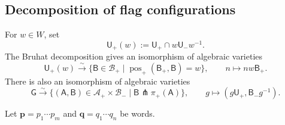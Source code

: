 \documentclass[10pt,a4paper]{article}
\theoremstyle{definition}
\theoremstyle{remark}
\newcommand{\Aplus}{\mathcal A_+}
\newcommand{\Bplus}{\mathcal B_+}
\newcommand{\Bminus}{\mathcal B_-}
\newcommand{\flagA}{\mathsf{A}}
\newcommand{\flagB}{\mathsf{B}}
\newcommand{\groupG}{\mathsf{G}}
\newcommand{\borelB}{\mathsf{B}}
\newcommand{\unipotentU}{\mathsf{U}}
\newcommand{\pos}{\operatorname{pos}}
\begin{document}
\subsection{Decomposition of flag configurations}
\label{subsec:double-flag-decomposition}

For \(w\in W\), set
\[
 \unipotentU_+(w):=\unipotentU_+\cap w\unipotentU_-w^{-1}.
\]
The Bruhat decomposition gives an isomorphism of algebraic varieties
\begin{equation}
 \unipotentU_+(w)
 \xrightarrow{\sim}
 \{\flagB\in\Bplus\mid\pos_+(\borelB_+,\flagB)=w\},
 \qquad
 n\longmapsto nw\borelB_+.
 \label{eq:component-bruhat-chart}
\end{equation}
There is also an isomorphism of algebraic varieties
\begin{equation}
 \groupG
 \xrightarrow{\sim}
 \{(\flagA,\flagB)\in\Aplus\times\Bminus
     \mid \flagB\pitchfork\pi_+(\flagA)\},
 \qquad
 g\longmapsto(g\unipotentU_+,\borelB_-g^{-1}).
 \label{eq:component-opposite-pair-isomorphism}
\end{equation}

Let \(\mathbf p=p_1\cdots p_m\) and \(\mathbf q=q_1\cdots q_n\) be words.
\end{document}
